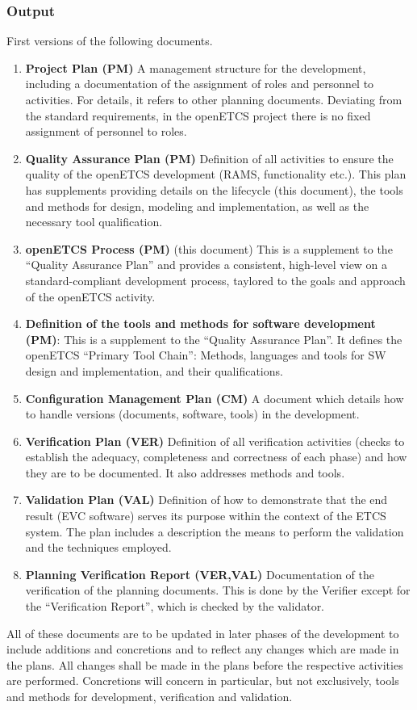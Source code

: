 \documentclass{template/openetcs_article}
\begin{document}
\subsubsection{Output}
\label{sec:0-output}
First versions of the following documents.
\begin{enumerate}
\item \textbf{Project Plan (PM)} A management structure for the
  development,  including a documentation of the assignment of roles
  and personnel to activities. For details, it refers to other planning
  documents. Deviating from the standard requirements,
  in the openETCS project there is no fixed assignment of personnel
  to roles.  
\item \textbf{Quality Assurance Plan (PM)} Definition of all
  activities to ensure the quality of the openETCS development (RAMS,
  functionality etc.). This plan has supplements providing details on
  the lifecycle (this document), the tools and methods for design, modeling and
  implementation, as well as the necessary tool qualification.
\item \textbf{openETCS Process (PM)} (this document) This is a
  supplement to the ``Quality Assurance Plan'' and provides a consistent,
  high-level view on a standard-compliant development process,
  taylored to the goals and approach of the openETCS activity. 
\item \textbf{Definition of the tools and methods for software
    development (PM)}: This is a supplement to the ``Quality Assurance
  Plan''. It defines the openETCS ``Primary Tool Chain'': Methods,
  languages and tools for SW design and implementation, and their
  qualifications.
\item \textbf{Configuration Management Plan (CM)} A document which
  details how to handle versions (documents, software, tools) in the
  development.
\item \textbf{Verification Plan (VER)} Definition of all verification
  activities (checks to establish the adequacy, completeness and
  correctness of each phase) and how they are to be documented. It
  also addresses methods and tools.
\item \textbf{Validation Plan (VAL)} Definition of how to demonstrate
  that the end result (EVC software) serves its purpose within the
  context of the ETCS system. The plan includes a description the
  means to perform the validation and the techniques employed.
\item \textbf{Planning Verification Report (VER,VAL)}
  Documentation of the verification of the planning documents. This is
  done by the Verifier except for the ``Verification Report'', which is
  checked by the validator.
\end{enumerate}
%
All of these documents are to be updated in later phases of the
development to include additions and concretions and to reflect any
changes which are made in the plans. All changes shall be made in the
plans before the respective activities are performed. Concretions will
concern in particular, but not exclusively, tools and methods for
development, verification and validation.
\end{document}
